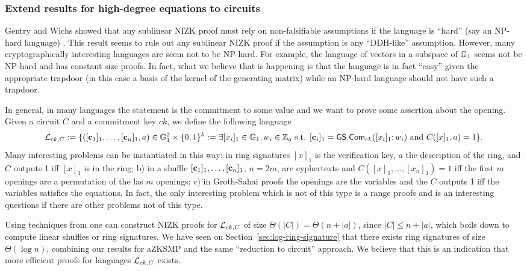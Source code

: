 \subsubsection{Extend results for high-degree equations to circuits}
Gentry and Wichs showed that any sublinear NIZK proof must rely on non-falsifiable  assumptions if the language is ``hard'' (say an NP-hard language) \cite{STOC:GenWic11}. This result seems to rule out any sublinear NIZK proof if the assumption is any ``DDH-like'' assumption. However, many cryptographically interesting languages are seem not to be NP-hard. For example, the language of vectors in a subspace of $\mathbb{G}_1$ seems not be NP-hard and has constant size proofs. In fact, what we believe that is happening is that the language is in fact ``easy'' given the appropriate trapdoor (in this case a basis of the kernel of the generating matrix) while an NP-hard language should not have such a trapdoor.

In general, in many languages the statement is the commitment to some value and we want to prove some assertion about the opening. Given a circuit $C$ and a commitment key $ck$, we define the following language
$$
\mathcal{L}_{ck,C}:= \{([\mathbf{c}_1]_1,\ldots,[\mathbf{c}_n]_1,a)\in\mathbb{G}_1^2\times\{0,1\}^k:= \exists [x_i]_1\in\mathbb{G}_1,w_i\in\mathbb{Z}_q \text{ s.t. } [\mathbf{c}_i]_1={\mathsf{GS}}.\mathsf{Com}_{ck}([x_i]_1;w_i)\text{ and }C([x]_1,a)=1\}.
$$
Many interesting problems can be instantiated in this way: in ring signatures $[x]_1$ is the verification key, $a$ the description of the ring, and $C$ outputs 1 iff $[x]_1$ is in the ring; b) in a shuffle $[\mathbf{c}_1]_1,\ldots,[\mathbf{c}_n]_1$, $n=2m$, are cyphertexts and $C([x]_1,\ldots,[x_n]_1)=1$ iff the first $m$ openings are a permutation of the las $m$ openings; c) in Groth-Sahai proofs the openings are the variables and the $C$ outputs 1 iff the variables satisfies the equations. In fact, the only interesting problem which is not of this type is a range proofs and is an interesting questions if there are other problems not of this type.

Using techniques from \cite{EC:GroOstSah06} one can construct NIZK proofs for $\mathcal{L}_{ck,C}$ of size $\Theta(|C|)=\Theta(n+|a|)$, since $|C|\leq n+|a|$, which boils down to compute linear shuffles or ring signatures. We have seen on Section~\ref{sec:log-ring-signature} that there exists ring signatures of size $\Theta(\log n)$, combining our results for aZKSMP and the same ``reduction to circuit'' approach. We believe that this is an indication that more efficient proofs for languages $\mathcal{L}_{ck,C}$ exists.

\fi

